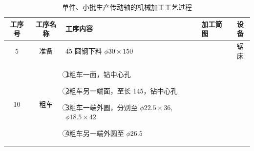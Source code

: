 \documentclass[UTF8]{ctexbook}
\newcommand{\◎}{\ensuremath{\bigcirc}}
\begin{document}
\begin{longtable}{|c|c|m{6cm}|m{6cm}|c|}
    \caption{单件、小批生产传动轴的机械加工工艺过程}\\
        \hline
        \textbf{工序号} & \textbf{工序名称} & \textbf{工序内容} & \textbf{加工简图} & \textbf{设备} \\
        \hline
        5 & 准备 & 45 圆钢下料 $\phi 30 \times 150$ & & 锯床 \\
        \hline
        10 & 粗车 & 
       
        \textcircled{1}粗车一面，钻中心孔
        
        \textcircled{2}粗车另一端面，至长 145，钻中心孔
        
        \textcircled{3}粗车一端外圆，分别至 $\phi 22.5 \times 36$, $\phi 18.5 \times 42$
        
        \textcircled{4}粗车另一端外圆至 $\phi 26.5$
        

\end{longtable}
\end{document}
